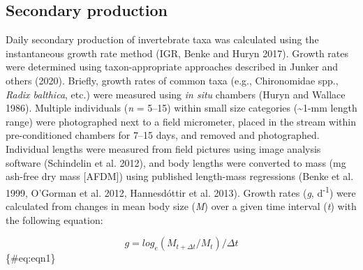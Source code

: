 \documentclass[
]{article}
\numberwithin{equation}
\begin{document}
\hypertarget{secondary-production}{%
\subsection{Secondary production}\label{secondary-production}}

Daily secondary production of invertebrate taxa was calculated using the
instantaneous growth rate method (IGR, Benke and Huryn 2017). Growth
rates were determined using taxon-appropriate approaches described in
Junker and others (2020). Briefly, growth rates of common taxa (e.g.,
Chironomidae spp., \emph{Radix balthica}, etc.) were measured using
\emph{in situ} chambers (Huryn and Wallace 1986). Multiple individuals
(\emph{n} = 5--15) within small size categories (\textasciitilde1-mm
length range) were photographed next to a field micrometer, placed in
the stream within pre-conditioned chambers for 7--15 days, and removed
and photographed. Individual lengths were measured from field pictures
using image analysis software (Schindelin et al. 2012), and body lengths
were converted to mass (mg ash-free dry mass {[}AFDM{]}) using published
length-mass regressions (Benke et al. 1999, O'Gorman et al. 2012,
Hannesdóttir et al. 2013). Growth rates (\emph{g},
d\textsuperscript{-1}) were calculated from changes in mean body size
(\emph{M}) over a given time interval (\emph{t}) with the following
equation:

\[g = log_e ( M_{t+\Delta t} / M_t) / \Delta t\] \{\#eq:eqn1\}
\end{document}
